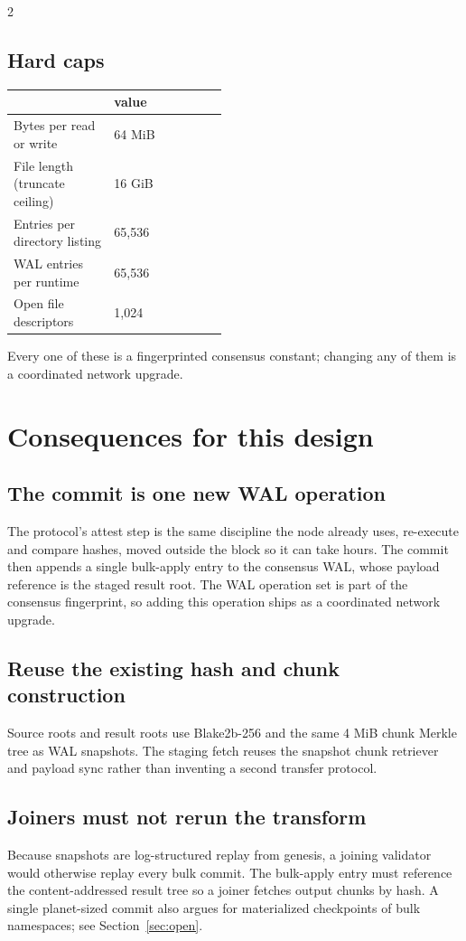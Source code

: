 \documentclass[10pt]{article}
\newcommand{\colhead}[1]{{\spartan\color{mutedtext}#1}}   %
\begin{document}
\begin{multicols}{2}
\subsection{Hard caps}
\vspace{1mm}
\begin{tabularx}{\linewidth}{@{}>{\spartansemi}p{0.47\linewidth}X@{}}
\toprule
\colhead{cap} & \colhead{value} \\
\midrule
Bytes per read or write & 64 MiB \\
File length (truncate ceiling) & 16 GiB \\
Entries per directory listing & 65,536 \\
WAL entries per runtime & 65,536 \\
Open file descriptors & 1,024 \\
\bottomrule
\end{tabularx}

Every one of these is a fingerprinted consensus constant; changing any of them is
a coordinated network upgrade.

\section{Consequences for this design}

\subsection{The commit is one new WAL operation}
The protocol's attest step is the same discipline the node already uses,
re-execute and compare hashes, moved outside the block so it can take hours. The
commit then appends a single bulk-apply entry to the consensus WAL, whose payload
reference is the staged result root. The WAL operation set is part of the
consensus fingerprint, so adding this operation ships as a coordinated network
upgrade.

\subsection{Reuse the existing hash and chunk construction}
Source roots and result roots use Blake2b-256 and the same 4 MiB chunk Merkle tree
as WAL snapshots. The staging fetch reuses the snapshot chunk retriever and
payload sync rather than inventing a second transfer protocol.

\subsection{Joiners must not rerun the transform}
Because snapshots are log-structured replay from genesis, a joining validator
would otherwise replay every bulk commit. The bulk-apply entry must reference the
content-addressed result tree so a joiner fetches output chunks by hash. A single
planet-sized commit also argues for materialized checkpoints of bulk namespaces;
see Section~\ref{sec:open}.


\end{multicols}
\end{document}
